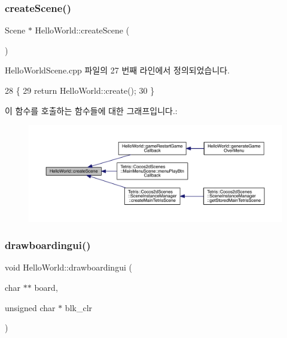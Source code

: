 \subsubsection{\texorpdfstring{create\+Scene()}{createScene()}}
{\footnotesize\ttfamily Scene $\ast$ Hello\+World\+::create\+Scene (\begin{DoxyParamCaption}{ }\end{DoxyParamCaption})\hspace{0.3cm}{\ttfamily [static]}}



Hello\+World\+Scene.\+cpp 파일의 27 번째 라인에서 정의되었습니다.


\begin{DoxyCode}
28 \{
29     \textcolor{keywordflow}{return} HelloWorld::create();
30 \}
\end{DoxyCode}
이 함수를 호출하는 함수들에 대한 그래프입니다.\+:
\nopagebreak
\begin{figure}[H]
\begin{center}
\leavevmode
\includegraphics[width=350pt]{d9/d98/class_hello_world_a1b700f5f9de04271533d3fa099d7b014_icgraph}
\end{center}
\end{figure}
\mbox{\label{class_hello_world_a0456ce3ab8880643c5e8739634156d93}} 
\subsubsection{\texorpdfstring{drawboardingui()}{drawboardingui()}}
{\footnotesize\ttfamily void Hello\+World\+::drawboardingui (\begin{DoxyParamCaption}\item[{char $\ast$$\ast$}]{board,  }\item[{unsigned char $\ast$}]{blk\+\_\+clr }\end{DoxyParamCaption})}

